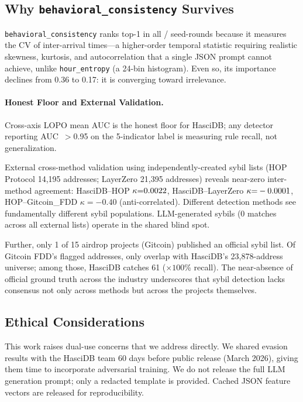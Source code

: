 \documentclass[sigconf,nonacm=false]{acmart}
\begin{document}
\subsection{Why \texttt{behavioral\_consistency} Survives}

\texttt{behavioral\_consistency} ranks top-1 in all \behavioralConsistencyTopInNRounds{}/\behavioralConsistencyTopTotalRounds{} seed-rounds because it measures the CV of inter-arrival times---a higher-order temporal statistic requiring realistic skewness, kurtosis, and autocorrelation that a single JSON prompt cannot achieve, unlike \texttt{hour\_entropy} (a 24-bin histogram). Even so, its importance declines from 0.36 to 0.17: it is converging toward irrelevance.

\paragraph{Honest Floor and External Validation.}
Cross-axis LOPO mean AUC \largeScaleCrossAxisGbmMeanAuc{} is the honest floor for HasciDB; any detector reporting AUC~$>$0.95 on the 5-indicator label is measuring rule recall, not generalization.

External cross-method validation using independently-created sybil lists (HOP Protocol 14,195 addresses; LayerZero 21,395 addresses) reveals near-zero inter-method agreement: HasciDB--HOP $\kappa{=}0.0022{}$, HasciDB--LayerZero $\kappa{=}-0.0001{}$, HOP--Gitcoin\_FDD $\kappa{=}{-}0.40$ (anti-correlated). Different detection methods see fundamentally different sybil populations. LLM-generated sybils (0 matches across all external lists) operate in the shared blind spot.

Further, only 1 of 15 airdrop projects (Gitcoin) published an official sybil list. Of Gitcoin FDD's \officialSybilGitcoinOfficialCount{} flagged addresses, only \officialSybilOverlapInHascidb{} overlap with HasciDB's 23,878-address universe; among those, HasciDB catches 61 (\officialSybilHascidbCatchRate{}$\times 100$\% recall). The near-absence of official ground truth across the industry underscores that sybil detection lacks consensus not only across methods but across the projects themselves.

\subsection{Ethical Considerations}
\label{sec:ethics}

This work raises dual-use concerns that we address directly.
We shared evasion results with the HasciDB team 60 days before public release (March 2026), giving them time to incorporate adversarial training. We do not release the full LLM generation prompt; only a redacted template is provided. Cached JSON feature vectors are released for reproducibility.
\end{document}
